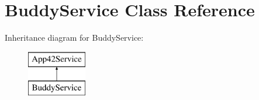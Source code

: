 \hypertarget{class_buddy_service}{\section{Buddy\+Service Class Reference}
\label{class_buddy_service}
}
Inheritance diagram for Buddy\+Service\+:\begin{figure}[H]
\begin{center}
\leavevmode
\includegraphics[height=2.000000cm]{class_buddy_service}
\end{center}
\end{figure}
